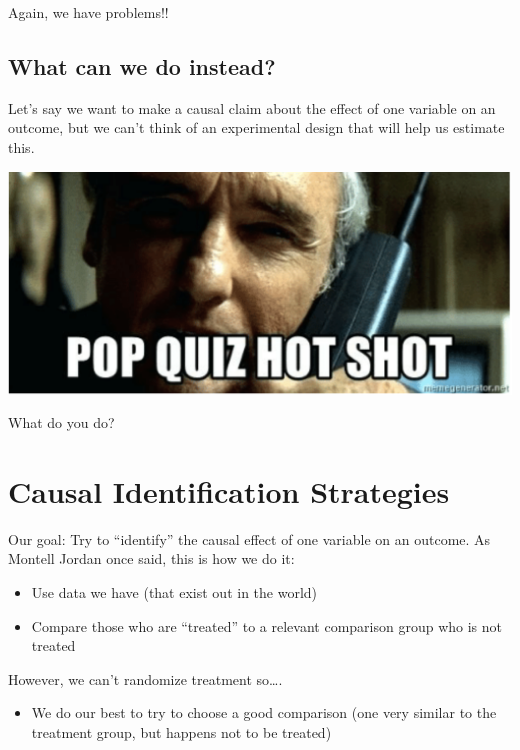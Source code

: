 \documentclass[
  letterpaper,
  DIV=11,
  numbers=noendperiod]{scrreprt}
\providecommand{\tightlist}{%
  \setlength{\itemsep}{0pt}\setlength{\parskip}{0pt}}\usepackage{longtable,booktabs,array}
\begin{document}
Again, we have problems!!

\hypertarget{what-can-we-do-instead}{%
\subsection{What can we do instead?}\label{what-can-we-do-instead}}

Let's say we want to make a causal claim about the effect of one
variable on an outcome, but we can't think of an experimental design
that will help us estimate this.

\includegraphics{images/popquiz.png}

What do you do?

\hypertarget{causal-identification-strategies}{%
\section{Causal Identification
Strategies}\label{causal-identification-strategies}}

Our goal: Try to ``identify'' the causal effect of one variable on an
outcome. As Montell Jordan once said, this is how we do it:

\begin{itemize}
\tightlist
\item
  Use data we have (that exist out in the world)
\item
  Compare those who are ``treated'' to a relevant comparison group who
  is not treated
\end{itemize}

However, we can't randomize treatment so\ldots.

\begin{itemize}
\tightlist
\item
  We do our best to try to choose a good comparison (one very similar to
  the treatment group, but happens not to be treated)
\end{itemize}
\end{document}
